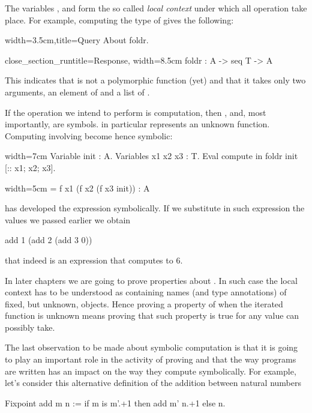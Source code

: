 The variables ,  and  form the so called
\emph{local context} under which all operation take place.
For example, computing the type of  gives the following:

\begin{coq}{}{width=3.5cm,title=Query}
About foldr.
\end{coq}
\begin{coqout}{close_section_run}{title=Response, width=8.5cm}
foldr : A -> seq T -> A
\end{coqout}

This indicates that  is not a polymorphic function (yet)
and that it takes only two arguments, an element of  and
a list of .

If the operation we intend to perform is computation, then
,  and, most importantly,  are symbols.
  in particular represents an unknown function.
Computing involving  become hence symbolic:

\begin{coq}{}{width=7cm}
Variable init : A.
Variables x1 x2 x3 : T.
Eval compute in
  foldr init [:: x1; x2; x3].
\end{coq}
\begin{coqout}{}{width=5cm}
= f x1 (f x2 (f x3 init))
: A	
\end{coqout}

\Coq{} has developed the expression symbolically.  If we substitute
in such expression the values we passed earlier we obtain

\begin{coq}{}{}
add 1 (add 2 (add 3 0))
\end{coq}
that indeed is an expression that computes to 6.

In later chapters we are going to prove properties about .
In such case the local context has to be understood as containing
names (and type annotations) of fixed, but unknown, objects.
Hence proving a property of  when the iterated function
 is unknown means proving that such property is true for any
value  can possibly take.

The last observation to be made about symbolic computation is that
it is going to play an important role in the activity of proving
and that the way programs are written has an impact on the way they
compute symbolically.  For example, let's consider this alternative
definition of the addition between natural numbers

\begin{coq}{}{}
Fixpoint add m n := if m is m'.+1 then add m' n.+1 else n.
\end{coq}

